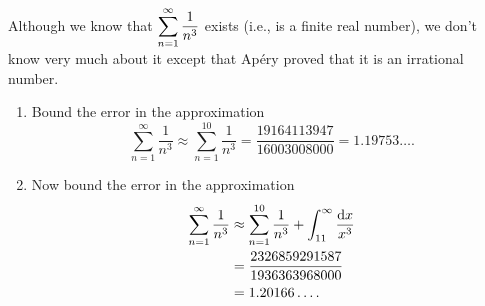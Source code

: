 \newpage

\begin{example}
Although we know that $\displaystyle\sum_{n=1}^\infty\frac{1}{n^3}$ exists (i.e., is a finite real number), we don't know very much about it except that Ap\'ery proved that it is an irrational number.
\begin{enumerate}
\item Bound the error in the approximation
\begin{equation*}
\sum_{n=1}^\infty\frac{1}{n^3} \approx \sum_{n=1}^{10}\frac{1}{n^3} = \frac{19164113947}{16003008000} = 1.19753\dots.
\end{equation*}
\ifdefined\SOLUTION
{}
\else
\fi
\vfill
\item  Now bound the error in the approximation
\begin{equation*}
\begin{split}
\sum_{n=1}^{\infty}\frac{1}{n^3}
&\approx \sum_{n=1}^{10}\frac{1}{n^3} + \int_{11}^\infty\frac{\mathrm{d} x}{x^3}\\
&= \frac{2326859291587}{1936363968000}\\ 
&= 1.20166\dots.
\end{split}
\end{equation*}
\ifdefined\SOLUTION
{}
\fi
\vfill
\end{enumerate}
\end{example}

